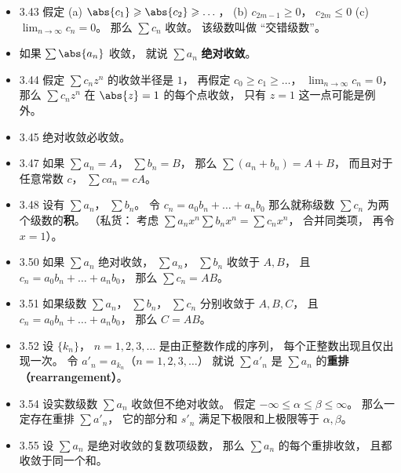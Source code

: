 \begin{itemize}
\item 3.43 假定 (a) $\abs{c_1}\geqslant \abs{c_2}\geqslant \dots$， (b) $c_{2m-1}\geqslant 0$， $c_{2m}\leqslant 0$ (c) $\lim_{n\to\infty} c_n=0$。 那么 $\sum c_n$ 收敛。 该级数叫做 “交错级数”。

\item 如果 $\sum \abs{a_n}$ 收敛， 就说 $\sum a_n$ \textbf{绝对收敛}。

\item 3.44 假定 $\sum c_n z^n$ 的收敛半径是 $1$， 再假定 $c_0\geqslant c_1\geqslant \dots$， $\lim_{n\to \infty}c_n=0$， 那么 $\sum c_nz^n$ 在 $\abs{z}=1$ 的每个点收敛， 只有 $z=1$ 这一点可能是例外。

\item 3.45 绝对收敛必收敛。

\item 3.47 如果 $\sum a_n=A$， $\sum b_n=B$， 那么 $\sum (a_n+b_n)=A+B$， 而且对于任意常数 $c$， $\sum ca_n=cA$。

\item 3.48 设有 $\sum a_n$， $\sum b_n$。 令 $c_n=a_0b_n+\dots+a_nb_0$ 那么就称级数 $\sum c_n$ 为两个级数的\textbf{积}。 （私货： 考虑 $\sum a_n x^n \sum b_n x^n = \sum c_n x^n$， 合并同类项， 再令 $x=1$）。

\item 3.50 如果 $\sum a_n$ 绝对收敛， $\sum a_n$， $\sum b_n$ 收敛于 $A,B$， 且 $c_n=a_0b_n+\dots+a_nb_0$， 那么 $\sum c_n = AB$。

\item 3.51 如果级数 $\sum a_n$， $\sum b_n$， $\sum c_n$ 分别收敛于 $A,B,C$， 且 $c_n=a_0b_n+\dots+a_nb_0$， 那么 $C=AB$。

\item 3.52 设 $\{k_n\}$， $n=1,2,3,\dots$ 是由正整数作成的序列， 每个正整数出现且仅出现一次。 令 $a'_n=a_{k_n}$（$n=1,2,3,\dots$） 就说 $\sum a'_n$ 是 $\sum a_n$ 的\textbf{重排（rearrangement）}。

\item 3.54 设实数级数 $\sum a_n$ 收敛但不绝对收敛。 假定 $-\infty\leqslant \alpha\leqslant\beta\leqslant\infty$。 那么一定存在重排 $\sum a'_n$， 它的部分和 $s'_n$ 满足下极限和上极限等于 $\alpha, \beta$。

\item 3.55 设 $\sum a_n$ 是绝对收敛的复数项级数， 那么 $\sum a_n$ 的每个重排收敛， 且都收敛于同一个和。
\end{itemize}
